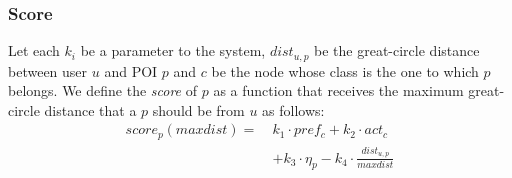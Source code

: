 \subsubsection{Score} \label{section:score}
Let each $k_i$ be a parameter to the system, $dist_{u,p}$ be the great-circle distance between user $u$ and POI $p$ and $c$ be the node whose class is the one to which $p$ belongs. We define the \textit{score} of $p$ as a function that receives the maximum great-circle distance that a $p$ should be from $u$ as follows:
\begin{equation} \label{eq:score}
    \begin{split}
        score_p(maxdist) = \ &k_1 \cdot pref_c + k_2 \cdot act_c \\
                                        &+ k_3 \cdot \eta_p - k_4 \cdot \frac{dist_{u,p}}{maxdist}
    \end{split}
\end{equation}